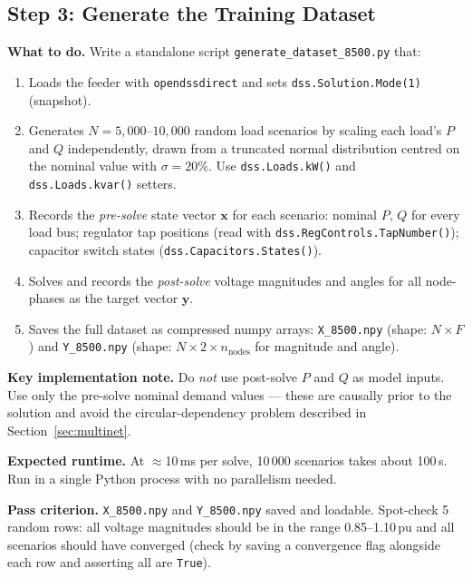 \documentclass[11pt]{article}
\begin{document}
\subsection{Step 3: Generate the Training Dataset}
\label{subsec:step3}

\noindent\textbf{What to do.}
Write a standalone script \texttt{generate\_dataset\_8500.py} that:

\begin{enumerate}[itemsep=2pt]
  \item Loads the feeder with \texttt{opendssdirect} and sets
    \texttt{dss.Solution.Mode(1)} (snapshot).
  \item Generates $N=5{,}000$--$10{,}000$ random load scenarios by scaling
    each load's $P$ and $Q$ independently, drawn from a truncated normal
    distribution centred on the nominal value with $\sigma = 20\%$.
    Use \texttt{dss.Loads.kW()} and \texttt{dss.Loads.kvar()} setters.
  \item Records the \emph{pre-solve} state vector $\mathbf{x}$ for each
    scenario: nominal $P$, $Q$ for every load bus; regulator tap positions
    (read with \texttt{dss.RegControls.TapNumber()}); capacitor switch
    states (\texttt{dss.Capacitors.States()}).
  \item Solves and records the \emph{post-solve} voltage magnitudes and
    angles for all node-phases as the target vector $\mathbf{y}$.
  \item Saves the full dataset as compressed numpy arrays:
    \texttt{X\_8500.npy} (shape: $N \times F$) and
    \texttt{Y\_8500.npy} (shape: $N \times 2 \times n_{\text{nodes}}$
    for magnitude and angle).
\end{enumerate}

\noindent\textbf{Key implementation note.}
Do \emph{not} use post-solve $P$ and $Q$ as model inputs.  Use only the
pre-solve nominal demand values --- these are causally prior to the solution
and avoid the circular-dependency problem described in
Section~\ref{sec:multinet}.

\noindent\textbf{Expected runtime.}
At $\approx$10\,ms per solve, 10\,000 scenarios takes about 100\,s.  Run
in a single Python process with no parallelism needed.

\noindent\textbf{Pass criterion.}
\texttt{X\_8500.npy} and \texttt{Y\_8500.npy} saved and loadable.  Spot-check
5 random rows: all voltage magnitudes should be in the range 0.85--1.10\,pu
and all scenarios should have converged (check by saving a convergence flag
alongside each row and asserting all are \texttt{True}).
\end{document}

